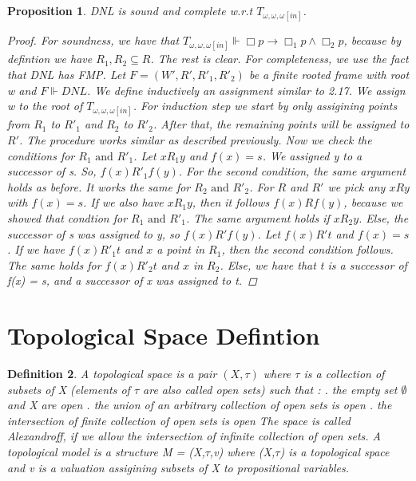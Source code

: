 \documentclass[12pt, a4paper]{scrartcl}
\newtheorem{definition}{Definition}[subsection]
\newtheorem{proposition}[definition]{Proposition}
\begin{document}
\begin{proposition}
    DNL is sound and complete w.r.t $T_{\omega,\omega,\omega[in]}$.

    \begin{proof}
    For soundness, we have that $T_{\omega,\omega,\omega[in]} \Vdash \Box p \rightarrow \Box_1 p \land \Box_2p$, because by defintion we have $R_1,R_2 \subseteq R$. The rest is clear.
    For completeness, we use the fact that DNL has FMP. Let $F = (W',R', R'_1, R'_2)$ be a finite rooted frame with root w and $F \Vdash DNL$. We define inductively an
    assignment similar to 2.17. We assign w to the root of $T_{\omega,\omega,\omega[in]}$. For induction step we start by only assigining points from $R_1$ to $R'_1$ and $R_2$ to $R'_2$. After that, the remaining points will be assigned to $R'$.
    The procedure works similar as described previously. \newline
    Now we check the conditions for $R_1 \mbox{ and } R'_1$. Let $xR_1y$ and $f(x) = s$. We assigned y to a successor of s. So, $f(x) R'_1f(y)$. For the second condition, the same argument holds as before.
    It works the same for $R_2 \mbox{ and } R'_2$. For $R$ and $R'$ we pick any $xRy$ with $f(x) = s$. 
    If we also have $xR_1y$, then it follows $f(x)Rf(y)$, because we showed that condtion for $R_1 \mbox{ and } R'_1$. The same argument holds if $xR_2y$. Else, the successor of s was assigned to y, so $f(x)R'f(y)$. 
    Let $f(x)R't$ and $f(x) = s$. If we have $f(x) R'_1 t$  and $x$ a point in $R_1$, then the second condition follows. The same holds for $f(x)R'_2t$ and $x$ in $R_2$.
    Else, we have that t is a successor of f(x) = s, and a successor of x was assigned to t.
    \end{proof}
        
\end{proposition}




\clearpage

\section{Topological Space Defintion}

\begin{definition}
    A topological space is a pair $(X, \tau)$ where $\tau$ is a collection of subsets of X (elements of $\tau$ are also called open sets) such that : 
    \newline
    . the empty set $\emptyset $ and X are open
    . the union of an arbitrary collection of open sets is open
    . the intersection of finite collection of open sets is open
    \newline
    \newline
    The space is called Alexandroff, if we allow the intersection of infinite collection of open sets.
    A topological model is a structure M = (X,$\tau$,v) where (X,$\tau$) is a topological space
    and v is a valuation assigining subsets of X to propositional variables. 
        
\end{definition}
\end{document}
